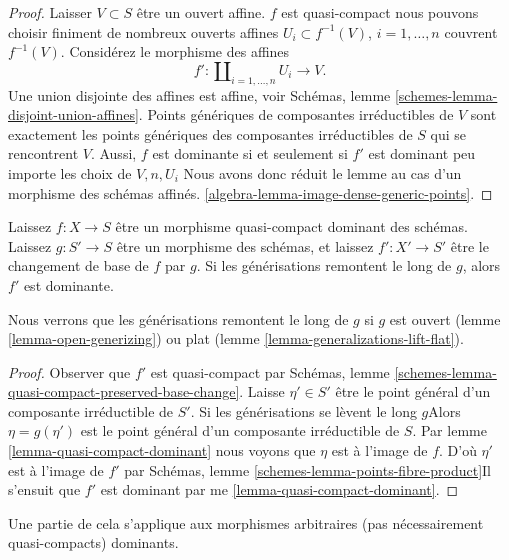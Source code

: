 \begin{proof}

Laisser $V \subset S$ être un ouvert affine. $f$ est quasi-compact nous pouvons choisir finiment de nombreux ouverts affines $U_i \subset f^{-1}(V)$, $i = 1, \ldots, n$ couvrent
$f^{-1}(V)$. Considérez le morphisme des affines
$$
f' :
\coprod\nolimits_{i = 1, \ldots, n} U_i
\longrightarrow
V.
$$
Une union disjointe des affines est affine, voir Schémas, lemme \ref{schemes-lemma-disjoint-union-affines}. Points génériques de composantes irréductibles de $V$
sont exactement les points génériques des composantes irréductibles de
$S$ qui se rencontrent $V$. Aussi, $f$ est dominante si et seulement si $f'$ est dominant peu importe les choix de $V, n, U_i$ Nous avons donc réduit le lemme au cas d'un morphisme des schémas affinés. \ref{algebra-lemma-image-dense-generic-points}.

\end{proof}

\begin{lemma}

\label{lemma-base-change-dominant}
Laissez $f : X \to S$ être un morphisme quasi-compact dominant des schémas. Laissez $g : S' \to S$ être un morphisme des schémas, et laissez $f' : X' \to S'$ être le changement de base de $f$ par $g$. Si les générisations remontent le long de $g$, alors $f'$ est dominante.
\end{lemma}

\noindent
Nous verrons que les générisations remontent le long de $g$ si $g$ est ouvert (lemme \ref{lemma-open-generizing}) ou plat (lemme \ref{lemma-generalizations-lift-flat}).

\begin{proof}

Observer que $f'$ est quasi-compact par Schémas, lemme
\ref{schemes-lemma-quasi-compact-preserved-base-change}. Laisse $\eta' \in S'$ être le point général d'un composante irréductible de $S'$. Si les générisations se lèvent le long $g$Alors $\eta = g(\eta')$ est le point général d'un composante irréductible de $S$. Par lemme \ref{lemma-quasi-compact-dominant}
nous voyons que $\eta$ est à l'image de $f$. D'où $\eta'$ est à l'image de $f'$ par Schémas, lemme \ref{schemes-lemma-points-fibre-product}Il s'ensuit que $f'$ est dominant par me \ref{lemma-quasi-compact-dominant}.

\end{proof}

\noindent
Une partie de cela s'applique aux morphismes arbitraires (pas nécessairement quasi-compacts) dominants.

